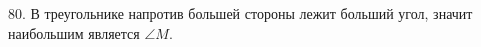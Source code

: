 80. В треугольнике напротив большей стороны лежит больший угол, значит наибольшим является $\angle M.$\\
